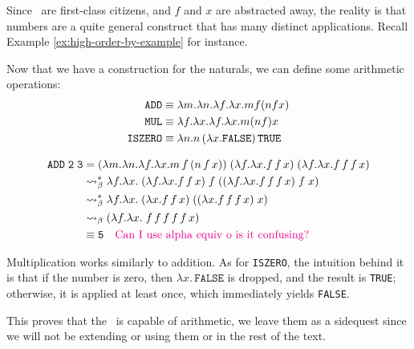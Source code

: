 \documentclass[12pt]{book}
\begin{document}
\begin{remark}
  Since \lterms \ are first-class citizens, and $f$ and $x$ are abstracted away, the reality is that numbers are a quite general construct that has many distinct applications. Recall Example \ref{ex:high-order-by-example} for instance.
\end{remark}
\begin{definition}
Now that we have a construction for the naturals, we can define some arithmetic operations:
\begin{align*}
  \texttt{ADD} &\equiv \lambda m.\lambda n. \lambda f. \lambda x. m f ( n f x) \\
  \texttt{MUL} &\equiv \lambda f.\lambda x. \lambda f. \lambda x. m (n f) x \\
  \texttt{ISZERO} &\equiv \lambda n. n\,(\lambda x.\texttt{FALSE})\,\texttt{TRUE}
\end{align*}
\end{definition}
\begin{example}
  \begin{center}
    \begin{align*}
      \texttt{ADD}\;\texttt{2}\;\texttt{3} &= (\lambda m.\lambda n.\lambda f.\lambda x. m\,f\,(n\,f\,x))\;(\lambda f.\lambda x. f\,f\,x)\;(\lambda f.\lambda x. f\,f\,f\,x) \\
                                           &\mathrel{\leadsto}_\beta^* \lambda f.\lambda x.\; (\lambda f.\lambda x. f\,f\,x)\;f\;((\lambda f.\lambda x. f\,f\,f\,x)\;f\;x) \\
                                           &\mathrel{\leadsto}_\beta^* \lambda f.\lambda x.\; (\lambda x. f\,f\,x)\;((\lambda x. f\,f\,f\,x)\;x) \\
                                           &\mathrel{\leadsto}_\beta (\lambda f.\lambda x.\; f\,f\,f\,f\,f\,x) \\
                                           & \equiv \texttt{5} \quad \text{\textcolor{magenta}{Can I use alpha equiv o is it confusing?}}
    \end{align*}
  \end{center}
Multiplication works similarly to addition. As for \texttt{ISZERO}, the intuition behind it is that if the number is zero, then \(\lambda x.\, \texttt{FALSE}\) is dropped, and the result is \texttt{TRUE}; otherwise, it is applied at least once, which immediately yields \texttt{FALSE}.
\end{example}
\begin{remark}
  This proves that the \lcalc \ is capable of arithmetic, we leave them as a sidequest since we will not be extending or using them or in the rest of the text.
\end{remark}
\end{document}
